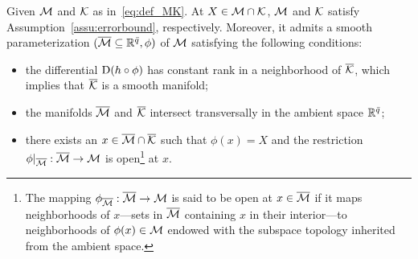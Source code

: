 \begin{assumption}\label{assu:MintersecK}
    Given $\mathcal{M}$ and $\mathcal{K}$ as in~\eqref{eq:def_MK}. At $X\in\mathcal{M}\cap\mathcal{K}$, $\mathcal{M}$ and $\mathcal{K}$ satisfy Assumption~\ref{assu:errorbound}, respectively. Moreover, it admits a smooth parameterization $(\overline{\mathcal{M}}\subseteq\mathbb{R}^{\bar{q}},\phi)$ of $\mathcal{M}$ satisfying the following conditions:
    \begin{itemize}
        \item [\emph{(i)}] the differential $\mathrm{D} (h\circ\phi)$ has constant rank in a neighborhood of $\overline{\mathcal{K}}$, which implies that $\overline{\mathcal{K}}$ is a smooth manifold;
        \item [\emph{(ii)}] the manifolds $\overline{\mathcal{M}}$ and $\overline{\mathcal{K}}$ intersect transversally in the ambient space $\mathbb{R}^{\bar{q}}$;
        \item [\emph{(iii)}] there exists an $x\in\overline{\mathcal{M}}\cap\overline{\mathcal{K}}$ such that $\phi(x)=X$ and the restriction $\phi|_{\overline{\mathcal{M}}}:\overline{\mathcal{M}}\to\mathcal{M}$ is open\footnote{The mapping $\phi_{\overline{\mathcal{M}}}:\overline{\mathcal{M}}\to\mathcal{M}$ is said to be open at $x\in\overline{\mathcal{M}}$ if it maps neighborhoods of $x$---sets in $\overline{\mathcal{M}}$ containing $x$ in their interior---to neighborhoods of $\phi(x)\in\mathcal{M}$ endowed with the subspace topology inherited from the ambient space.} at $x$.
    \end{itemize}
\end{assumption}


